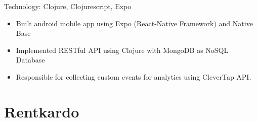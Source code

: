 \documentclass[11pt,a4paper,sans]{moderncv} %
\begin{document}
{Technology: Clojure, Clojurescript, Expo}{}{}
{\begin{itemize}
\item Built android mobile app using Expo (React-Native Framework) and Native Base
\item Implemented RESTful API using Clojure with MongoDB as NoSQL Database
\item Responsible for collecting custom events for analytics using CleverTap API.
\end{itemize}}



\section{Rentkardo}


\begin{comment}

\section{Bennett, Coleman \& Co. Ltd (BCCL - The Times Group)}

\cvitem{May'2016--Jul'2016}{
\vspace{-5mm}
\begin{itemize}
\item Research on OWASP Vulnerabilities.
\item Gained Hands on Testing Experience on DVWA using Burpsuite, sqlmap, nmap.
\item Understood Project Management of Security Projects
\end{itemize}
}
\end{comment}

\end{document}

